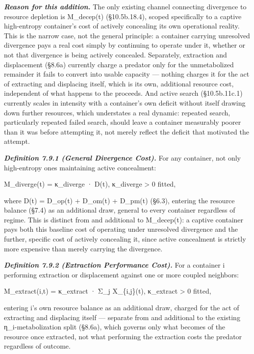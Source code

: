 \documentclass[
]{article}
\begin{document}
\emph{\textbf{Reason for this addition.}} The only existing channel
connecting divergence to resource depletion is M\_decep(t)
(§10.5b.18.4), scoped specifically to a captive high-entropy container's
cost of actively concealing its own operational reality. This is the
narrow case, not the general principle: a container carrying unresolved
divergence pays a real cost simply by continuing to operate under it,
whether or not that divergence is being actively concealed. Separately,
extraction and displacement (§8.6a) currently charge a predator only for
the unmetabolized remainder it fails to convert into usable capacity ---
nothing charges it for the act of extracting and displacing itself,
which is its own, additional resource cost, independent of what happens
to the proceeds. And active search (§10.5b.11c.1) currently scales in
intensity with a container's own deficit without itself drawing down
further resources, which understates a real dynamic: repeated search,
particularly repeated failed search, should leave a container measurably
poorer than it was before attempting it, not merely reflect the deficit
that motivated the attempt.

\emph{\textbf{Definition 7.9.1 (General Divergence Cost).}} For any
container, not only high-entropy ones maintaining active concealment:

M\_diverge(t) = κ\_diverge · D(t), κ\_diverge \textgreater{} 0 fitted,

where D(t) = D\_op(t) + D\_om(t) + D\_pm(t) (§6.3), entering the
resource balance (§7.4) as an additional draw, general to every
container regardless of regime. This is distinct from and additional to
M\_decep(t): a captive container pays both this baseline cost of
operating under unresolved divergence and the further, specific cost of
actively concealing it, since active concealment is strictly more
expensive than merely carrying the divergence.

\emph{\textbf{Definition 7.9.2 (Extraction Performance Cost).}} For a
container i performing extraction or displacement against one or more
coupled neighbors:

M\_extract(i,t) = κ\_extract · Σ\_j X\_\{i,j\}(t), κ\_extract
\textgreater{} 0 fitted,

entering i's own resource balance as an additional draw, charged for the
act of extracting and displacing itself --- separate from and additional
to the existing η\_i-metabolization split (§8.6a), which governs only
what becomes of the resource once extracted, not what performing the
extraction costs the predator regardless of outcome.
\end{document}
